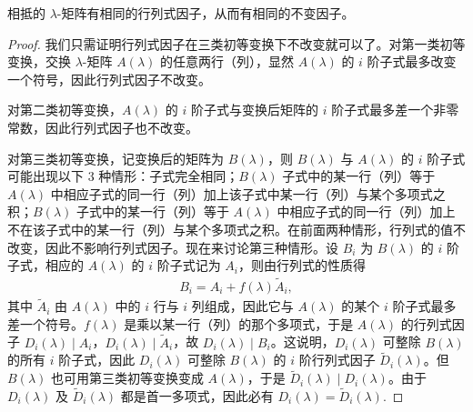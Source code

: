 \documentclass[../../main.tex]{subfiles}%
\begin{document}
\begin{theorem}\label{theorem:相抵的lamda矩阵有相同的行列式因子和不变因子}
相抵的 $\lambda$-矩阵有相同的行列式因子，从而有相同的不变因子。
\end{theorem}
\begin{proof}

我们只需证明行列式因子在三类初等变换下不改变就可以了。对第一类初等变换，交换 $\lambda$-矩阵 $A(\lambda)$ 的任意两行（列），显然 $A(\lambda)$ 的 $i$ 阶子式最多改变一个符号，因此行列式因子不改变。

对第二类初等变换，$A(\lambda)$ 的 $i$ 阶子式与变换后矩阵的 $i$ 阶子式最多差一个非零常数，因此行列式因子也不改变。

对第三类初等变换，记变换后的矩阵为 $B(\lambda)$，则 $B(\lambda)$ 与 $A(\lambda)$ 的 $i$ 阶子式可能出现以下 3 种情形：子式完全相同；$B(\lambda)$ 子式中的某一行（列）等于 $A(\lambda)$ 中相应子式的同一行（列）加上该子式中某一行（列）与某个多项式之积；$B(\lambda)$ 子式中的某一行（列）等于 $A(\lambda)$ 中相应子式的同一行（列）加上不在该子式中的某一行（列）与某个多项式之积。在前面两种情形，行列式的值不改变，因此不影响行列式因子。现在来讨论第三种情形。设 $B_i$ 为 $B(\lambda)$ 的 $i$ 阶子式，相应的 $A(\lambda)$ 的 $i$ 阶子式记为 $A_i$，则由行列式的性质得
\begin{align*}
B_i = A_i + f(\lambda)\widetilde{A}_i,
\end{align*}
其中 $\widetilde{A}_i$ 由 $A(\lambda)$ 中的 $i$ 行与 $i$ 列组成，因此它与 $A(\lambda)$ 的某个 $i$ 阶子式最多差一个符号。$f(\lambda)$ 是乘以某一行（列）的那个多项式，于是 $A(\lambda)$ 的行列式因子 $D_i(\lambda)\mid A_i$，$D_i(\lambda)\mid\widetilde{A}_i$，故 $D_i(\lambda)\mid B_i$。这说明，$D_i(\lambda)$ 可整除 $B(\lambda)$ 的所有 $i$ 阶子式，因此 $D_i(\lambda)$ 可整除 $B(\lambda)$ 的 $i$ 阶行列式因子 $\widetilde{D}_i(\lambda)$。但 $B(\lambda)$ 也可用第三类初等变换变成 $A(\lambda)$，于是 $\widetilde{D}_i(\lambda)\mid D_i(\lambda)$。由于 $D_i(\lambda)$ 及 $\widetilde{D}_i(\lambda)$ 都是首一多项式，因此必有 $D_i(\lambda)=\widetilde{D}_i(\lambda)$.

\end{proof}
\end{document}
